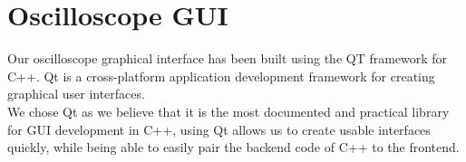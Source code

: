\section{Oscilloscope GUI}
    Our oscilloscope graphical interface has been built using the QT framework for C++. Qt is a cross-platform application development framework for creating graphical user interfaces. \\
    We chose Qt as we believe that it is the most documented and practical library for GUI development in C++, using Qt allows us to create usable interfaces quickly, while being able to easily pair the backend code of C++ to the frontend.
